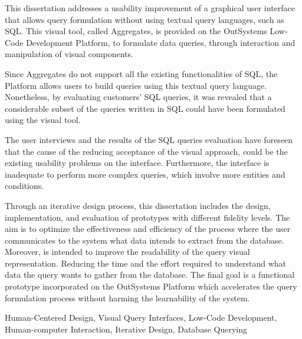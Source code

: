 This dissertation addresses a usability improvement of a graphical user interface that allows query formulation without using textual query languages, such as SQL. This visual tool, called Aggregates, is provided on the OutSystems Low-Code Development Platform, to formulate data queries, through interaction and manipulation of visual components. 

Since Aggregates do not support all the existing functionalities of SQL, the Platform allows users to build queries using this textual query language. Nonetheless, by evaluating customers' SQL queries, it was revealed that a considerable subset of the queries written in SQL could have been formulated using the visual tool.

The user interviews and the results of the SQL queries evaluation have foreseen that the cause of the reducing acceptance of the visual approach, could be the existing usability problems on the interface. Furthermore, the interface is inadequate to perform more complex queries, which involve more entities and conditions.

Through an iterative design process, this dissertation includes the design, implementation, and evaluation of prototypes with different fidelity levels. The aim is to optimize the effectiveness and efficiency of the process where the user communicates to the system what data intends to extract from the database. Moreover, is intended to improve the readability of the query visual representation. Reducing the time and the effort required to understand what data the query wants to gather from the database. The final goal is a functional prototype incorporated on the OutSystems Platform which accelerates the query formulation process without harming the learnability of the system.


\begin{keywords}
Human-Centered Design, Visual Query Interfaces, Low-Code Development, Human-computer Interaction, Iterative Design, Database Querying
\end{keywords} 
